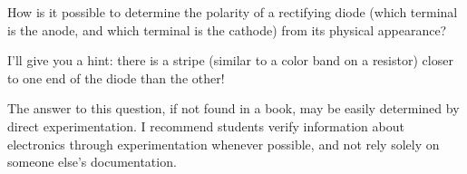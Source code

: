 

How is it possible to determine the polarity of a rectifying diode (which terminal is the anode, and which terminal is the cathode) from its physical appearance?







I'll give you a hint: there is a stripe (similar to a color band on a resistor) closer to one end of the diode than the other!







The answer to this question, if not found in a book, may be easily determined by direct experimentation.  I recommend students verify information about electronics through experimentation whenever possible, and not rely solely on someone else's documentation.



